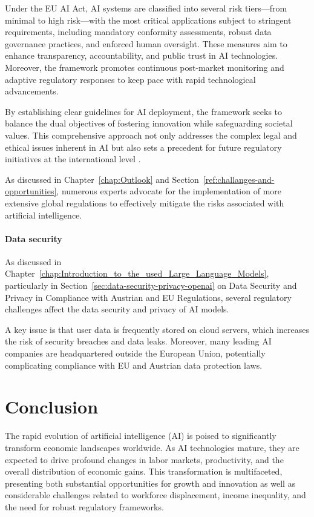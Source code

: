 Under the EU AI Act, AI systems are classified into several risk tiers—from minimal to high risk—with the most critical applications subject to stringent requirements, including mandatory conformity assessments, robust data governance practices, and enforced human oversight. These measures aim to enhance transparency, accountability, and public trust in AI technologies. Moreover, the framework promotes continuous post-market monitoring and adaptive regulatory responses to keep pace with rapid technological advancements.

By establishing clear guidelines for AI deployment, the framework seeks to balance the dual objectives of fostering innovation while safeguarding societal values. This comprehensive approach not only addresses the complex legal and ethical issues inherent in AI but also sets a precedent for future regulatory initiatives at the international level \cite{EURegFrameworkAI}.

As discussed in Chapter~\ref{chap:Outlook} and Section~\ref{ref:challanges-and-opportunities}, numerous experts advocate for the implementation of more extensive global regulations to effectively mitigate the risks associated with artificial intelligence.

\paragraph{Data security}

As discussed in Chapter~\ref{chap:Introduction_to_the_used_Large_Language_Models}, particularly in Section~\ref{sec:data-security-privacy-openai} on Data Security and Privacy in Compliance with Austrian and EU Regulations, several regulatory challenges affect the data security and privacy of AI models.

A key issue is that user data is frequently stored on cloud servers, which increases the risk of security breaches and data leaks. Moreover, many leading AI companies are headquartered outside the European Union, potentially complicating compliance with EU and Austrian data protection laws.


\section{Conclusion}
\label{sec:conclusion}

The rapid evolution of artificial intelligence (AI) is poised to significantly transform economic landscapes worldwide. 
As AI technologies mature, they are expected to drive profound changes in labor markets, productivity, and the overall distribution of economic gains. 
This transformation is multifaceted, presenting both substantial opportunities for growth and innovation as well as considerable challenges related to workforce displacement,
income inequality, and the need for robust regulatory frameworks.


